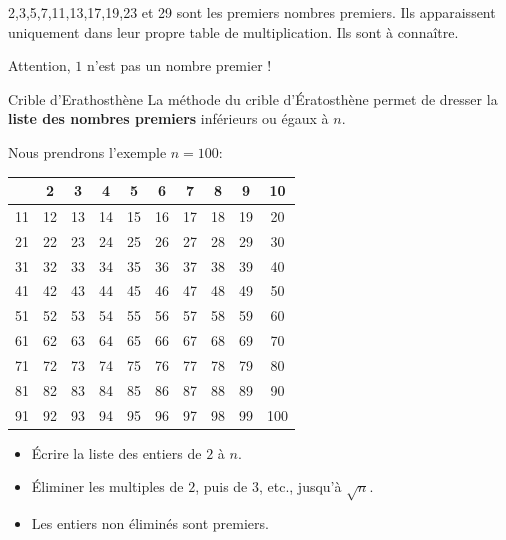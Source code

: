 \documentclass[10pt,a4paper,openany,twoside,prof]{book}
\begin{document}
\begin{ex}{}{}
  2,3,5,7,11,13,17,19,23 et 29 sont les premiers nombres premiers. Ils apparaissent uniquement dans leur propre table de multiplication. Ils sont à connaître.
\end{ex}

\begin{rem}{}{}
	Attention, $1$ n'est pas un nombre premier !
\end{rem}


\begin{methode}{Crible d'Erathosthène}{}
La méthode du crible d'Ératosthène permet de dresser la \textbf{liste des nombres premiers} inférieurs ou égaux à $n$.

Nous prendrons l'exemple $n=100$:

\begin{minipage}{.6\textwidth}
  \begin{tabular}{|*{10}{c|}}
\hline
 & 2 & 3 & 4 & 5 & 6 & 7 & 8 & 9 & 10\\
\hline
11 & 12 & 13 & 14 & 15 & 16 & 17 & 18 & 19 & 20\\
\hline
21 & 22 & 23 & 24 & 25 & 26 & 27 & 28 & 29 & 30\\
\hline
31 & 32 & 33 & 34 & 35 & 36 & 37 & 38 & 39 & 40\\
\hline
41 & 42 & 43 & 44 & 45 & 46 & 47 & 48 & 49 & 50\\
\hline
51 & 52 & 53 & 54 & 55 & 56 & 57 & 58 & 59 & 60\\
\hline
61 & 62 & 63 & 64 & 65 & 66 & 67 & 68 & 69 & 70\\
\hline
71 & 72 & 73 & 74 & 75 & 76 & 77 & 78 & 79 & 80\\
\hline
81 & 82 & 83 & 84 & 85 & 86 & 87 & 88 & 89 & 90\\
\hline
91 & 92 & 93 & 94 & 95 & 96 & 97 & 98 & 99 & 100 \\
\hline
\end{tabular}
\end{minipage}
\begin{minipage}{.4\textwidth}
\begin{itemize}
  \item Écrire la liste des entiers de $2$ à $n$.
  \item Éliminer les multiples de $2$, puis de $3$, etc., jusqu'à $\sqrt{n}$.
  \item Les entiers non éliminés sont premiers.
\end{itemize}
\end{minipage}

\end{methode}
\end{document}
